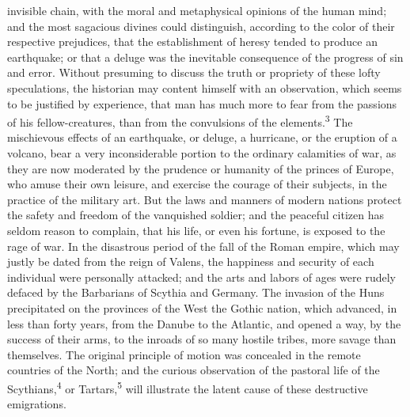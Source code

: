 invisible chain, with the moral and metaphysical opinions of the
human mind; and the most sagacious divines could distinguish,
according to the color of their respective prejudices, that the
establishment of heresy tended to produce an earthquake; or that
a deluge was the inevitable consequence of the progress of sin
and error. Without presuming to discuss the truth or propriety of
these lofty speculations, the historian may content himself with
an observation, which seems to be justified by experience, that
man has much more to fear from the passions of his
fellow-creatures, than from the convulsions of the elements.\textsuperscript{3}
The mischievous effects of an earthquake, or deluge, a hurricane,
or the eruption of a volcano, bear a very inconsiderable portion
to the ordinary calamities of war, as they are now moderated by
the prudence or humanity of the princes of Europe, who amuse
their own leisure, and exercise the courage of their subjects, in
the practice of the military art. But the laws and manners of
modern nations protect the safety and freedom of the vanquished
soldier; and the peaceful citizen has seldom reason to complain,
that his life, or even his fortune, is exposed to the rage of
war. In the disastrous period of the fall of the Roman empire,
which may justly be dated from the reign of Valens, the happiness
and security of each individual were personally attacked; and the
arts and labors of ages were rudely defaced by the Barbarians of
Scythia and Germany. The invasion of the Huns precipitated on the
provinces of the West the Gothic nation, which advanced, in less
than forty years, from the Danube to the Atlantic, and opened a
way, by the success of their arms, to the inroads of so many
hostile tribes, more savage than themselves. The original
principle of motion was concealed in the remote countries of the
North; and the curious observation of the pastoral life of the
Scythians,\textsuperscript{4} or Tartars,\textsuperscript{5} will illustrate the latent cause of
these destructive emigrations.



